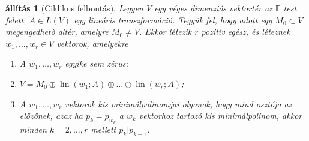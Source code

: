 \documentclass[9pt, a4paper, showtrims]{memoir}
\theoremstyle{plain}
\newtheorem{proposition}{állítás}[chapter]
\theoremstyle{remark}
\theoremstyle{definition}
\DeclareMathOperator{\lin}{lin}
\begin{document}
\begin{proposition}[Ciklikus felbontás]
    Legyen $V$ egy véges dimenziós vektortér az $\mathbb{F}$ test felett, $A\in L\left( V \right)$ egy lineáris transzformáció.
    Tegyük fel, hogy adott egy $M_0\subset V$ megengedhető altér, amelyre $M_0\neq V$.
    Ekkor létezik $r$ pozitív egész, és léteznek $w_1,\dots,w_r\in V$ vektorok, amelyekre
    \begin{enumerate}
        \item A $w_1,\dots,w_r$ egyike sem zérus;
        \item $V=M_0\oplus\lin\left( w_1;A \right)\oplus\ldots\oplus\lin\left( w_r;A \right)$;
        \item A $w_1,\dots,w_r$ vektorok kis minimálpolinomjai olyanok, hogy mind osztója az előzőnek, 
            azaz ha $p_k=p_{w_k}$ a $w_k$ vektorhoz tartozó kis minimálpolinom, 
            akkor minden $k=2,\dots,r$ mellett $p_k|p_{k-1}$.\qedhere
    \end{enumerate}
\end{proposition}
\end{document}
